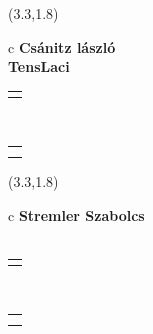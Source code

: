 \documentclass[11pt]{article}
\begin{document}
\makebox(3.3,1.8){
  \renewcommand\arraystretch{1.3}
  \begin{tabular}[c]{c}
    \hspace{8.5mm}
    \LARGE\bf{ Csánitz lászló }\\
    \hspace{8.5mm}
    \Large{ TensLaci }\\
    \renewcommand\arraystretch{3}
    \begin{tabular}[c]{c}
      \centering
      \fontfamily{phv}\selectfont{
        \textbf{
          \textsc{
            \scriptsize{
            \color{Dark}{ Ismerkedő }\color{Bright}{ Webmester }\color{Bright}{ Sminkmester }\color{Bright}{ Programozó }
            }
          }
        }
      }
    \end{tabular}
    \\
    \renewcommand\arraystretch{1}
    \begin{tabular}{p{3.3in}}
      \hspace{.7cm}\\
      \hspace{.7cm}\emph{  }\\
    \end{tabular}
  \end{tabular}
}

\makebox(3.3,1.8){
  \renewcommand\arraystretch{1.3}
  \begin{tabular}[c]{c}
    \hspace{8.5mm}
    \LARGE\bf{ Stremler Szabolcs }\\
    \hspace{8.5mm}
    \Large{  }\\
    \renewcommand\arraystretch{3}
    \begin{tabular}[c]{c}
      \centering
      \fontfamily{phv}\selectfont{
        \textbf{
          \textsc{
            \scriptsize{
            \color{Bright}{ Ismerkedő }\color{Bright}{ Webmester }\color{Bright}{ Sminkmester }\color{Dark}{ Programozó }
            }
          }
        }
      }
    \end{tabular}
    \\
    \renewcommand\arraystretch{1}
    \begin{tabular}{p{3.3in}}
      \hspace{.7cm}\\
      \hspace{.7cm}\emph{  }\\
    \end{tabular}
  \end{tabular}
}
\end{document}
